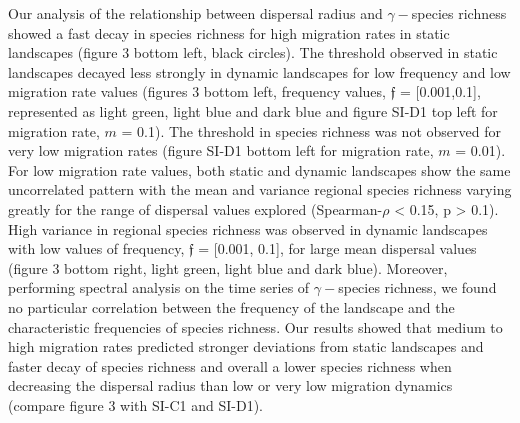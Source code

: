 \documentclass[12pt]{article}
\begin{document}
    Our analysis of the relationship between dispersal radius and $\gamma-$species richness showed a fast decay in species richness for high migration rates in static landscapes (figure 3 bottom left, black circles). The threshold observed in static landscapes decayed less strongly in dynamic landscapes for low frequency and low migration rate values (figures 3 bottom left, frequency values, $\mathfrak{f}$ = [0.001,0.1], represented as light green, light blue and dark blue and figure SI-D1 top left for migration rate, $m$ = 0.1). The threshold in species richness was not observed for very low migration rates (figure SI-D1 bottom left for migration rate, $m$ = 0.01). For low migration rate values, both static and dynamic landscapes show the same uncorrelated pattern with the mean and variance regional species richness varying greatly for the range of dispersal values explored (Spearman-$\rho$ < 0.15, p > 0.1). High variance in regional species richness was observed in dynamic landscapes with low values of frequency, $\mathfrak{f}$ = [0.001, 0.1], for large mean dispersal values (figure 3 bottom right, light green, light blue and dark blue). Moreover, performing spectral analysis on the time series of $\gamma-$species richness, we found no particular correlation between the frequency of the landscape and the characteristic frequencies of species richness. Our results showed that medium to high migration rates predicted stronger deviations from static landscapes and faster decay of species richness and overall a lower species richness when decreasing the dispersal radius than low or very low migration dynamics (compare figure 3 with SI-C1 and SI-D1).  
    
\end{document}

